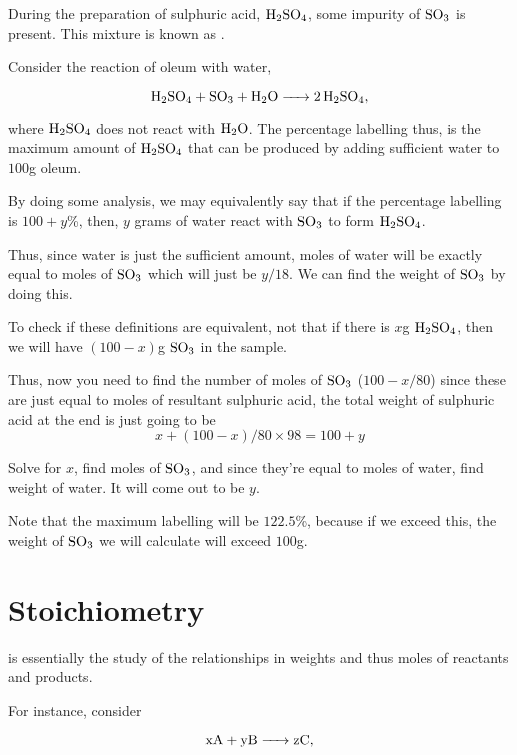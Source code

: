 During the preparation of sulphuric acid, \(\ce{H2SO4}\), some impurity of 
\(\ce{SO3}\) is present. This mixture is known as .

Consider the reaction of oleum with water, 

\begin{equation*}
  \ce{H2SO4 + SO3 + H2O -> 2H2SO4},
\end{equation*}

where \(\ce{H2SO4}\) does not react with \(\ce{H2O}\). The percentage labelling thus, is 
the maximum amount of \(\ce{H2SO4}\) that can be produced by adding sufficient water to \(100\)\si{\g} oleum.

By doing some analysis, we may equivalently say that if the percentage labelling is \(100 + y\)\%, then, 
\(y\) grams of water react with \(\ce{SO3}\) to form \(\ce{H2SO4}\).

Thus, since water is just the sufficient amount, moles of water will be exactly equal to 
moles of \(\ce{SO3}\) which will just be \(y/18\). We can find the weight of \(\ce{SO3}\) by 
doing this. 

To check if these definitions are equivalent, not that if there is \(x\)\si{\g}
\(\ce{H2SO4}\), then we will have \((100 - x)\)\si{\g} \(\ce{SO3}\) in the sample.

Thus, now you need to find the number of moles of \(\ce{SO3}\) (\(100 - x/80\)) since these 
are just equal to moles of resultant sulphuric acid, the total weight of sulphuric 
acid at the end is just going to be 
\begin{equation*}
  x + (100 - x)/80 \times 98 = 100 + y
\end{equation*}

Solve for \(x\), find moles of \(\ce{SO3}\), and since they're equal to moles of water, 
find weight of water. It will come out to be \(y\).

Note that the maximum labelling will be \(122.5\)\%, because if we exceed this, 
the weight of \(\ce{SO3}\) we will calculate will exceed \(100\)\si{\g}. 

\section{Stoichiometry}

 is essentially the study of the 
relationships in weights and thus moles of reactants and products.

For instance, consider 

\begin{equation*}
  \ce{xA + yB -> zC},
\end{equation*}


